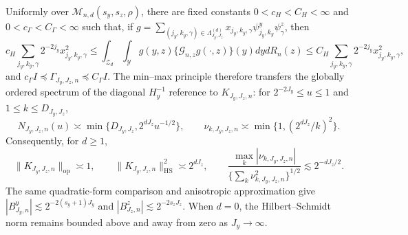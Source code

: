 Uniformly over \(\mathcal M_{n,d}(s_y,s_z,\rho)\), there are fixed constants \(0<c_H<C_H<\infty\) and \(0<c_\Gamma<C_\Gamma<\infty\) such that, if \(g=\sum_{(j_y,k_y,\gamma)\in\Lambda_{J_y,J_z}^{(d)}}x_{j_y,k_y,\gamma}\psi^y_{j_y,k_y}\psi^z_\gamma\), then \[c_H\sum_{j_y,k_y,\gamma}2^{-2j_y}x_{j_y,k_y,\gamma}^2\le\int_{\mathcal Z_d}\int_{\mathcal Y}g(y,z)\{\mathcal G_{n,z}g(\cdot,z)\}(y)dydR_n(z)\le C_H\sum_{j_y,k_y,\gamma}2^{-2j_y}x_{j_y,k_y,\gamma}^2,\] and \(c_\Gamma I\preceq\Gamma_{J_y,J_z,n}\preceq C_\Gamma I\). The min--max principle therefore transfers the globally ordered spectrum of the diagonal \(H_y^{-1}\) reference to \(K_{J_y,J_z,n}\): for \(2^{-2J_y}\le u\le1\) and \(1\le k\le D_{J_y,J_z}\), \[N_{J_y,J_z,n}(u)\asymp\min\{D_{J_y,J_z},2^{dJ_z}u^{-1/2}\},\qquad \nu_{k,J_y,J_z,n}\asymp\min\{1,(2^{dJ_z}/k)^2\}.\] Consequently, for \(d\ge1\), \[\|K_{J_y,J_z,n}\|_{\mathrm{op}}\asymp1,\qquad \|K_{J_y,J_z,n}\|_{\mathrm{HS}}^2\asymp2^{dJ_z},\qquad \frac{\max_k|\nu_{k,J_y,J_z,n}|}{\{\sum_k\nu_{k,J_y,J_z,n}^2\}^{1/2}}\lesssim2^{-dJ_z/2}.\] The same quadratic-form comparison and anisotropic approximation give \( |B^y_{J_y,n}|\lesssim2^{-2(s_y+1)J_y}\) and \( |B^z_{J_z,n}|\lesssim2^{-2s_zJ_z}\). When \(d=0\), the Hilbert--Schmidt norm remains bounded above and away from zero as \(J_y\to\infty\).
